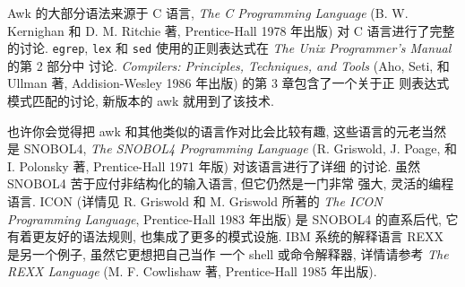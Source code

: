 Awk 的大部分语法来源于 C 语言, \textit{The C Programming Language} 
(B. W. Kernighan 和 D. M. Ritchie 著, Prentice-Hall 1978 年出版)
对 C 语言进行了完整的讨论. \texttt{egrep}, \texttt{lex} 和 \texttt{sed}
使用的正则表达式在 \textit{The Unix Programmer's Manual} 的第 2 部分中
讨论. \textit{Compilers: Principles, Techniques, and Tools} (Aho, Seti, 
和 Ullman 著, Addision-Wesley 1986 年出版) 的第 3 章包含了一个关于正
则表达式模式匹配的讨论, 新版本的 awk 就用到了该技术.

也许你会觉得把 awk 和其他类似的语言作对比会比较有趣, 这些语言的元老当然
是 SNOBOL4, \textit{The SNOBOL4 Programming Language} (R. Griswold, J.
Poage, 和 I. Polonsky 著, Prentice-Hall 1971 年版) 对该语言进行了详细
的讨论. 虽然 SNOBOL4 苦于应付非结构化的输入语言, 但它仍然是一门非常
强大, 灵活的编程语言. ICON (详情见 R. Griswold 和 M. Griswold 所著的
\textit{The ICON Programming Language}, Prentice-Hall 1983 年出版) 是
SNOBOL4 的直系后代, 它有着更友好的语法规则, 也集成了更多的模式设施.
IBM 系统的解释语言 REXX 是另一个例子, 虽然它更想把自己当作
一个 shell 或命令解释器, 详情请参考 \textit{The REXX Language} (M. F.
Cowlishaw 著, Prentice-Hall 1985 年出版).
